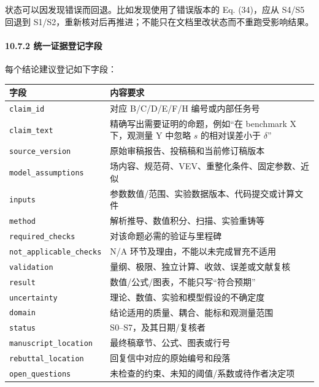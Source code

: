 \documentclass[
  chinese,
  UTF8]{ctexart}
\newcounter{none} %
\begin{document}
状态可以因发现错误而回退。比如发现使用了错误版本的 Eq. (34)，应从 S4/S5
回退到 S1/S2，重新核对后再推进；不能只在文档里改状态而不重跑受影响结果。

\paragraph{10.7.2
统一证据登记字段}\label{ux7edfux4e00ux8bc1ux636eux767bux8bb0ux5b57ux6bb5}

每个结论建议登记如下字段：

{\def\LTcaptype{none} %
\begin{longtable}[]{@{}
  >{\raggedright\arraybackslash}p{}
  >{\raggedright\arraybackslash}p{}@{}}
\toprule\noalign{}
\begin{minipage}[b]{\linewidth}\raggedright
字段
\end{minipage} & \begin{minipage}[b]{\linewidth}\raggedright
内容要求
\end{minipage} \\
\midrule\noalign{}
\endhead
\bottomrule\noalign{}
\endlastfoot
\texttt{claim\_id} & 对应 B/C/D/E/F/H 编号或内部任务号 \\
\texttt{claim\_text} & 精确写出需要证明的命题，例如``在 benchmark X
下，观测量 Y 中忽略 \(s\) 的相对误差小于 \ensuremath{\delta}'' \\
\texttt{source\_version} & 原始审稿报告、投稿稿和当前修订稿版本 \\
\texttt{model\_assumptions} &
场内容、规范荷、VEV、重整化条件、固定参数、近似 \\
\texttt{inputs} & 参数数值/范围、实验数据版本、代码提交或计算文件 \\
\texttt{method} & 解析推导、数值积分、扫描、实验重铸等 \\
\texttt{required\_checks} & 对该命题必需的验证与里程碑 \\
\texttt{not\_applicable\_checks} & N/A
环节及理由，不能以未完成冒充不适用 \\
\texttt{validation} & 量纲、极限、独立计算、收敛、误差或文献复核 \\
\texttt{result} & 数值/公式/图表，不能只写``符合预期'' \\
\texttt{uncertainty} & 理论、数值、实验和模型假设的不确定度 \\
\texttt{domain} & 结论适用的质量、耦合、能标和观测量范围 \\
\texttt{status} & S0--S7，及其日期/复核者 \\
\texttt{manuscript\_location} & 最终稿章节、公式、图表或行号 \\
\texttt{rebuttal\_location} & 回复信中对应的原始编号和段落 \\
\texttt{open\_questions} &
未检查的约束、未知的阈值/系数或待作者决定项 \\
\end{longtable}
}
\end{document}
